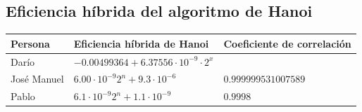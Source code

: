 \documentclass[a4paper, 11pt]{article}
\begin{document}
\subsection{Eficiencia híbrida del algoritmo de Hanoi}
\begin{tabular}{|l|l|l|}
	\hline
	Persona & Eficiencia híbrida de Hanoi & Coeficiente de correlación \\
	\hline
 Darío & $ -0.00499364+ 6.37556\cdot 10^{-9}\cdot 2^x$\\
   \hline
 José Manuel & $6.00 \cdot 10^{-9} 2^n + 9.3 \cdot 10^{-6}$ & $0.999999531007589$\\
   \hline
 Pablo & $6.1 \cdot 10^{-9} 2^n + 1.1 \cdot 10^{-9}$ & $0.9998$\\
 \hline
\end{tabular}
\end{document}
